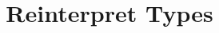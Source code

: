 \documentclass[format=acmsmall, review=false, screen=true]{acmfart} %
\begin{document}
\title[Reinterpret Types]{Reinterpret Types}

\maketitle
 



% 


% 
% 

%
\end{document}
